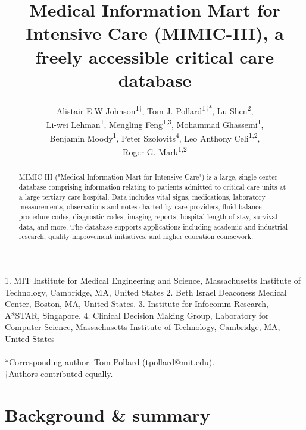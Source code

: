 \documentclass[english]{article}
\begin{document}
\title{Medical Information Mart for Intensive Care (MIMIC-III), a freely accessible critical care database}


\author{
Alistair E.W Johnson\textsuperscript{1{†}},
Tom J. Pollard\textsuperscript{1{†}{*}},
Lu Shen\textsuperscript{2}, \\
Li-wei Lehman\textsuperscript{1},
Mengling Feng\textsuperscript{1,3},
Mohammad Ghassemi\textsuperscript{1}, \\
Benjamin Moody\textsuperscript{1},
Peter Szolovits\textsuperscript{4},
Leo Anthony Celi\textsuperscript{1,2}, \\
Roger G. Mark\textsuperscript{1,2}
}

\maketitle
\thispagestyle{fancy}

1. MIT Institute for Medical Engineering and Science, Massachusetts Institute of Technology, Cambridge, MA, United States 2. Beth Israel Deaconess Medical Center, Boston, MA, United States. 3. Institute for Infocomm Research, A*STAR, Singapore. 4. Clinical Decision Making Group, Laboratory for Computer Science, Massachusetts Institute of Technology, Cambridge, MA, United States \\ 
\\
{*}Corresponding author: Tom Pollard (tpollard@mit.edu). \\
{†}Authors contributed equally.

\begin{abstract} %
MIMIC-III ("Medical Information Mart for Intensive Care") is a large, single-center database comprising information relating to patients admitted to critical care units at a large tertiary care hospital. Data includes vital signs, medications, laboratory measurements, observations and notes charted by care providers, fluid balance, procedure codes, diagnostic codes, imaging reports, hospital length of stay, survival data, and more. The database supports applications including academic and industrial research, quality improvement initiatives, and higher education coursework.
\end{abstract}

\section*{Background \& summary} %
\end{document}
